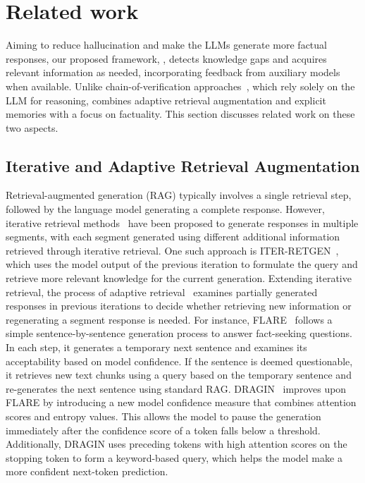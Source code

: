 \section{Related work}
\label{sec:related}

Aiming to reduce hallucination and make the LLMs generate more factual responses, our proposed framework, \model, detects knowledge gaps and acquires relevant information as needed, incorporating feedback from auxiliary models when available.  Unlike chain-of-verification approaches~\cite[CoVe]{dhuliawala-etal-2024-chain}, which rely solely on the LLM for reasoning, \model combines adaptive retrieval augmentation and explicit memories with a focus on factuality. This section discusses related work on these two aspects. 

\subsection{Iterative and Adaptive Retrieval Augmentation}

Retrieval-augmented generation (RAG) typically involves a single retrieval step, followed by the language model generating a complete response. However, iterative retrieval methods~\cite[\S5]{gao2024retrievalaugmentedgenerationlargelanguage} have been proposed to generate responses in multiple segments, with each segment generated using different additional information retrieved through iterative retrieval.
One such approach is ITER-RETGEN~\citep{shao-etal-2023-enhancing}, which uses the model output of the previous iteration to formulate the query and retrieve more relevant knowledge for the current generation.
Extending iterative retrieval, the process of adaptive retrieval~\cite[\S5]{gao2024retrievalaugmentedgenerationlargelanguage} examines partially generated responses in previous iterations to decide whether retrieving new information or regenerating a segment response is needed. 
For instance, FLARE~\citep{jiang-etal-2023-active} follows a simple sentence-by-sentence generation process to answer fact-seeking questions. 
In each step, it generates a temporary next sentence and examines its acceptability based on model confidence. 
If the sentence is deemed questionable, it retrieves new text chunks using a query based on the temporary sentence and re-generates the next sentence using standard RAG.
DRAGIN~\citep{su-etal-2024-dragin} improves upon FLARE by introducing a new model confidence measure that combines attention scores and entropy values. This allows the model to pause the generation immediately after the confidence score of a token falls below a threshold. Additionally, DRAGIN uses preceding tokens with high attention scores on the stopping token to form a keyword-based query, which helps the model make a more confident next-token prediction.

